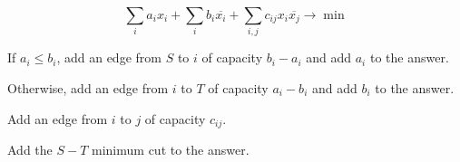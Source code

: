 \[\sum_i a_i x_i + \sum_i b_i \overline{x_i} + \sum_{i, j} c_{i j} x_i \overline{x_j} \to \min\]

If $a_i \le b_i$,
add an edge from $S$ to $i$ of capacity $b_i - a_i$
and add $a_i$ to the answer.

Otherwise,
add an edge from $i$ to $T$ of capacity $a_i - b_i$
and add $b_i$ to the answer.

Add an edge from $i$ to $j$ of capacity $c_{i j}$.

Add the $S-T$ minimum cut to the answer.
